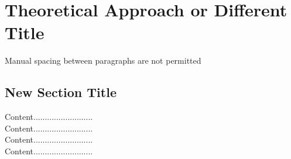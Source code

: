 \chapter{Theoretical Approach or Different Title}

\begin{justify}
    Manual spacing between paragraphs are not permitted
\end{justify}

\section{New Section Title}
\begin{justify}

    Content..........................\\
    Content..........................\\
    Content..........................\\
    Content..........................

\end{justify}

